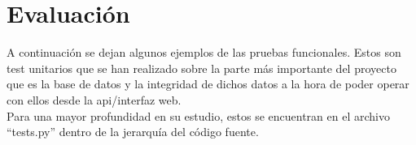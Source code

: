 \chapter{Evaluación}
\label{chap:evaluación}

A continuación se dejan algunos ejemplos de las pruebas funcionales. Estos son test unitarios que se han realizado sobre la parte más importante del proyecto que es la base de datos y la integridad de dichos datos a la hora de poder operar con ellos desde la api/interfaz web.\\

Para una mayor profundidad en su estudio, estos se encuentran en el archivo ``tests.py'' dentro de la jerarquía del código fuente.\\



